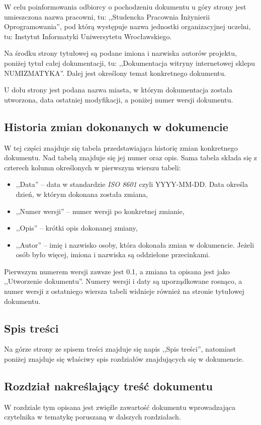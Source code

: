 \documentclass 	[11pt, a4paper, leqno]	{article}					%
\begin{document}
W celu poinformowania odbiorcy o pochodzeniu dokumentu u góry strony jest umieszczona nazwa pracowni, tu: ,,Studencka Pracownia Inżynierii Oprogramowania'', pod którą występuje nazwa jednostki organizacyjnej uczelni, tu: Instytut Informatyki Uniwersytetu Wrocławskiego.

Na środku strony tytułowej są podane imiona i nazwiska autorów projektu, poniżej tytuł całej dokumentacji, tu: ,,Dokumentacja witryny internetowej sklepu NUMIZMATYKA''.
Dalej jest określony temat konkretnego dokumentu. 

U dołu strony jest podana nazwa miasta, w którym dokumentacja została utworzona, data ostatniej modyfikacji, a poniżej numer wersji dokumentu.

\subsection{Historia zmian dokonanych w dokumencie}
\noindent
W tej części znajduje się tabela przedstawiająca historię zmian konkretnego dokumentu. Nad tabelą znajduje się jej numer oraz opis. Sama tabela składa się z czterech kolumn określonych w pierwszym wierszu tabeli:
\begin{itemize}
	\item ,,Data'' -- data w standardzie \textit{ISO 8601} czyli YYYY-MM-DD. Data określa dzień, w którym dokonana została zmiana,
	\item ,,Numer wersji'' -- numer wersji po konkretnej zmianie,
	\item ,,Opis'' -- krótki opis dokonanej zmiany,
	\item ,,Autor'' -- imię i nazwisko osoby, która dokonała zmian w dokumencie. Jeżeli osób było więcej, imiona i nazwiska są oddzielone przecinkami.
\end{itemize}

Pierwszym numerem wersji zawsze jest 0.1, a zmiana ta opisana jest jako ,,Utworzenie dokumentu''. Numery wersji i daty są uporządkowane rosnąco, a numer wersji z ostatniego wiersza tabeli widnieje również na stronie tytułowej dokumentu.

\subsection{Spis treści}
\noindent
Na górze strony ze spisem treści znajduje się napis ,,Spis treści'', natomiast poniżej znajduje się właściwy spis rozdziałów znajdujących się w dokumencie. 

\subsection{Rozdział nakreślający treść dokumentu}
\noindent
W rozdziale tym opisana jest zwięźle zawartość dokumentu wprowadzająca czytelnika w tematykę poruszaną w dalszych rozdziałach.
\end{document}
